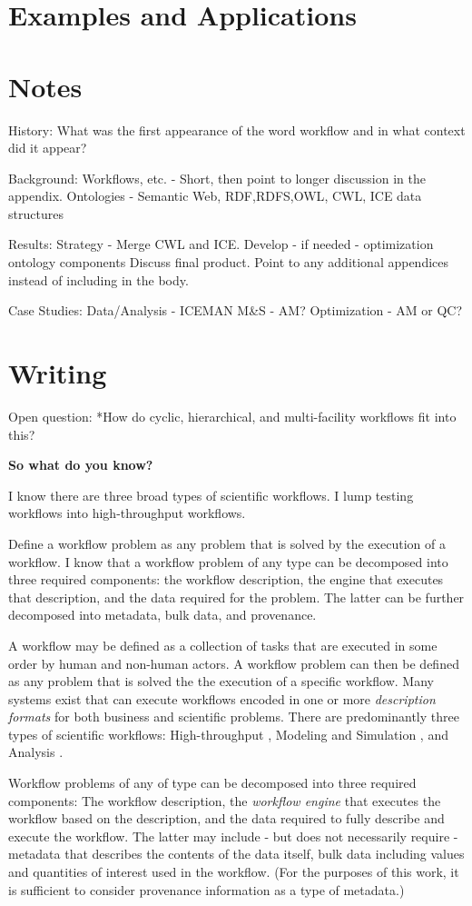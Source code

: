 \section{Examples and Applications}

\section{Notes}

History:
What was the first appearance of the word workflow and in what context did it
appear?

Background:
Workflows, etc. - Short, then point to longer discussion in the appendix.
Ontologies - Semantic Web, {RDF,RDFS,OWL}, CWL, ICE data structures

Results:
Strategy - Merge CWL and ICE. Develop - if needed - optimization ontology components
Discuss final product. Point to any additional appendices instead of including in the body.

Case Studies:
Data/Analysis - ICEMAN
M\&S - AM?
Optimization - AM or QC?

\section{Writing}

Open question:
*How do cyclic, hierarchical, and multi-facility workflows fit into this?

\textbf{So what do you know?}

I know there are three broad types of scientific workflows. I lump testing
workflows into high-throughput workflows.

Define a workflow problem as any problem that is solved by the execution of a
workflow. I know that a workflow problem of any type can be decomposed into
three required components: the workflow description, the engine that executes
that description, and the data required for the problem. The latter can be
further decomposed into metadata, bulk data, and provenance.

A workflow may be defined as a collection of tasks that are executed in some
order by human and non-human actors. A workflow problem can then be defined as
any problem that is solved the the execution of a specific workflow. Many
systems exist that can execute workflows encoded in one or more
\textit{description formats} for both business and scientific problems. There
are predominantly three types of scientific workflows: High-throughput \cite{},
Modeling and Simulation \cite{}, and Analysis \cite{}.

Workflow problems of any of type can be decomposed into three required
components: The workflow description, the \textit{workflow engine} that
executes the workflow based on the description, and the data required to fully
describe and execute the workflow. The latter may include - but does not
necessarily require - metadata that describes the contents of the data itself,
bulk data including values and quantities of interest used in the workflow.
(For the purposes of this work, it is sufficient to consider provenance
information as a type of metadata.)
